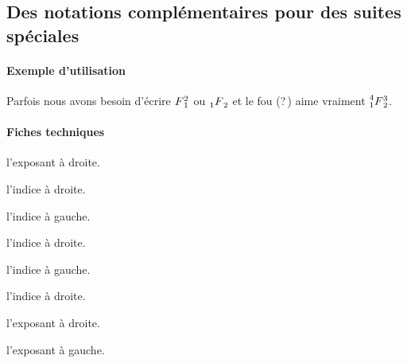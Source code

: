 \documentclass[12pt,a4paper]{article}
\begin{document}

\subsection{Des notations complémentaires pour des suites spéciales}

\paragraph{Exemple d'utilisation}

\begin{tcblisting}{}
Parfois nous avons besoin d'écrire $\seqplus{F}{1}{2}$ ou $\seqhypergeo{F}{1}{2}$ et
le fou (?\,) aime vraiment $\seqsuprageo{F}{1}{2}{3}{4}$.
\end{tcblisting}


\paragraph{Fiches techniques}


 l'exposant à droite.

 l'indice à droite.


\bigskip



 l'indice à gauche.

 l'indice à droite.


\bigskip



 l'indice à gauche.

 l'indice à droite.

 l'exposant à droite.

 l'exposant à gauche.
\end{document}
